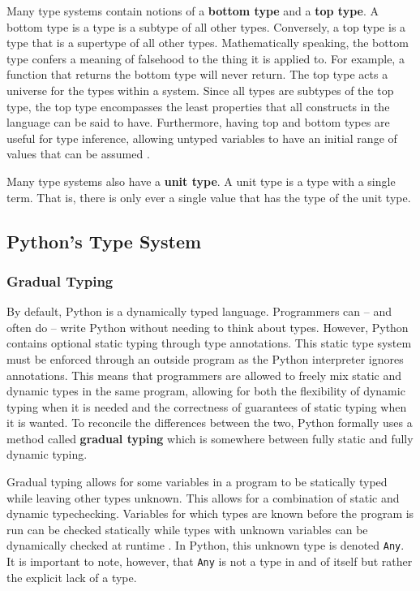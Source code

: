\documentclass[10pt,twocolumn]{article}
\begin{document}
Many type systems contain notions of a \textbf{bottom type} and a \textbf{top type}. A bottom type is a type is a subtype of all other types. Conversely, a top type is a type that is a supertype of all other types. Mathematically speaking, the bottom type confers a meaning of falsehood to the thing it is applied to. For example, a function that returns the bottom type will never return. The top type acts a universe for the types within a system. Since all types are subtypes of the top type, the top type encompasses the least properties that all constructs in the language can be said to have. Furthermore, having top and bottom types are useful for type inference, allowing untyped variables to have an initial range of values that can be assumed \cite{Pierce:BQB}. 

Many type systems also have a \textbf{unit type}. A unit type is a type with a single term. That is, there is only ever a single value that has the type of the unit type.
 
\subsection{Python's Type System}

\subsubsection{Gradual Typing}
By default, Python is a dynamically typed language. Programmers can -- and often do -- write Python without needing to think about types. However, Python contains optional static typing through type annotations. This static type system must be enforced through an outside program as the Python interpreter ignores annotations. This means that programmers are allowed to freely mix static and dynamic types in the same program, allowing for both the flexibility of dynamic typing when it is needed and the correctness of guarantees of static typing when it is wanted. To reconcile the differences between the two, Python formally uses a method called \textbf{gradual typing} which is somewhere between fully static and fully dynamic typing. 


Gradual typing allows for some variables in a program to be statically typed while leaving other types unknown. This allows for a combination of static and dynamic typechecking. Variables for which types are known before the program is run can be checked statically while types with unknown variables can be dynamically checked at runtime \cite{jsiek_what_2014}. In Python, this unknown type is denoted \verb|Any|. It is important to note, however, that \verb|Any| is not a type in and of itself but rather the explicit lack of a type.
\end{document}
